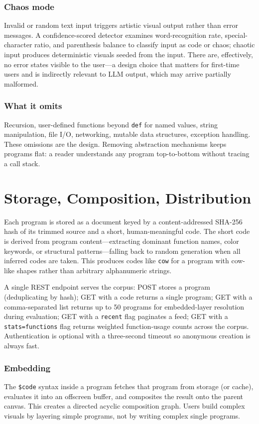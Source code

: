 \documentclass[letterpaper]{article}
\begin{document}
\subsubsection{Chaos mode} Invalid or random text input triggers artistic visual output rather than error messages. A confidence-scored detector examines word-recognition rate, special-character ratio, and parenthesis balance to classify input as code or chaos; chaotic input produces deterministic visuals seeded from the input. There are, effectively, no error states visible to the user---a design choice that matters for first-time users and is indirectly relevant to LLM output, which may arrive partially malformed.

\subsubsection{What it omits} Recursion, user-defined functions beyond \texttt{def} for named values, string manipulation, file I/O, networking, mutable data structures, exception handling. These omissions are the design. Removing abstraction mechanisms keeps programs flat: a reader understands any program top-to-bottom without tracing a call stack.

\section{Storage, Composition, Distribution}

Each program is stored as a document keyed by a content-addressed SHA-256 hash of its trimmed source and a short, human-meaningful code. The short code is derived from program content---extracting dominant function names, color keywords, or structural patterns---falling back to random generation when all inferred codes are taken. This produces codes like \texttt{cow} for a program with cow-like shapes rather than arbitrary alphanumeric strings.

A single REST endpoint serves the corpus: POST stores a program (deduplicating by hash); GET with a code returns a single program; GET with a comma-separated list returns up to 50 programs for embedded-layer resolution during evaluation; GET with a \texttt{recent} flag paginates a feed; GET with a \texttt{stats=functions} flag returns weighted function-usage counts across the corpus. Authentication is optional with a three-second timeout so anonymous creation is always fast.

\subsubsection{Embedding} The \texttt{\$code} syntax inside a program fetches that program from storage (or cache), evaluates it into an offscreen buffer, and composites the result onto the parent canvas. This creates a directed acyclic composition graph. Users build complex visuals by layering simple programs, not by writing complex single programs.
\end{document}
